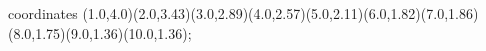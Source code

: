 					coordinates { (1.0,4.0)(2.0,3.43)(3.0,2.89)(4.0,2.57)(5.0,2.11)(6.0,1.82)(7.0,1.86)(8.0,1.75)(9.0,1.36)(10.0,1.36)};